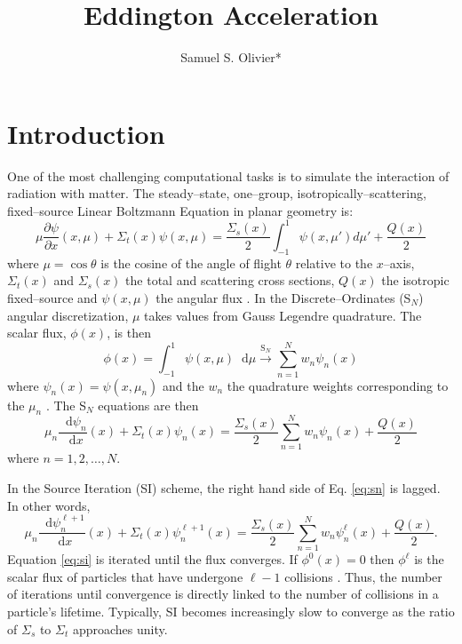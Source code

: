 \documentclass{anstrans}
\title{Eddington Acceleration}
\author{Samuel S. Olivier*}
\institute{Department of Nuclear Engineering, Texas A\&M University, College Station, TX 77843}
\newcommand{\SN}{S$_N$\xspace}
\newcommand{\ud}{\mathop{}\!\mathrm{d}} %
\newcommand{\pderiv}[2]{\frac{\partial #1}{\partial #2}}
\newcommand{\dderiv}[2]{\frac{\ud #1}{\ud #2}}
\begin{document}
\section{Introduction}
	One of the most challenging computational tasks is to simulate the interaction of radiation with matter. The steady--state, one--group, isotropically--scattering, fixed--source Linear Boltzmann Equation in planar geometry is: 
		\begin{equation} \label{eq:bte}
			\mu \pderiv{\psi}{x}(x, \mu) + \Sigma_t(x) \psi(x,\mu) = 
			\frac{\Sigma_s(x)}{2} \int_{-1}^{1} \psi(x, \mu') d\mu' + \frac{Q(x)}{2}
		\end{equation}
	where $\mu = \cos\theta$ is the cosine of the angle of flight $\theta$ relative to the $x$--axis, $\Sigma_t(x)$ and $\Sigma_s(x)$ the total and scattering cross sections, $Q(x)$ the isotropic fixed--source and $\psi(x, \mu)$ the angular flux \cite{adams}. In the Discrete--Ordinates (\SN) angular discretization, $\mu$ takes values from Gauss Legendre quadrature. The scalar flux, $\phi(x)$, is then 
		\begin{equation} \label{eq:quad}
			\phi(x) = \int_{-1}^1 \psi(x, \mu) \ud\mu 
				\xrightarrow{\text{S}_N} \sum_{n=1}^N w_n \psi_n(x)
		\end{equation}
	where $\psi_n(x) = \psi(x,\mu_n)$ and the $w_n$ the quadrature weights corresponding to the $\mu_n$ \cite{llnl}. The \SN equations are then 
		\begin{equation} \label{eq:sn}
			\mu_n \dderiv{\psi_n}{x}(x) + \Sigma_t(x) \psi_n(x) = 
			\frac{\Sigma_s(x)}{2} \sum_{n=1}^N w_n \psi_n(x) + \frac{Q(x)}{2} 
		\end{equation}
	where $n = 1, 2, \dots, N$. 

	In the Source Iteration (SI) scheme, the right hand side of Eq. \ref{eq:sn} is lagged. In other words, 
		\begin{equation} \label{eq:si}
			\mu_n \dderiv{\psi_n^{\ell+1}}{x}(x) + \Sigma_t(x) \psi_n^{\ell+1}(x) = 
			\frac{\Sigma_s(x)}{2} \sum_{n=1}^N w_n \psi_n^\ell(x) + \frac{Q(x)}{2}. 
		\end{equation}
	Equation \ref{eq:si} is iterated until the flux converges. If $\phi^0(x) = 0$ then $\phi^\ell$ is the scalar flux of particles that have undergone $\ell - 1$ collisions \cite{adams}. Thus, the number of iterations until convergence is directly linked to the number of collisions in a particle's lifetime. Typically, SI becomes increasingly slow to converge as the ratio of $\Sigma_s$ to $\Sigma_t$ approaches unity. 
\end{document}
